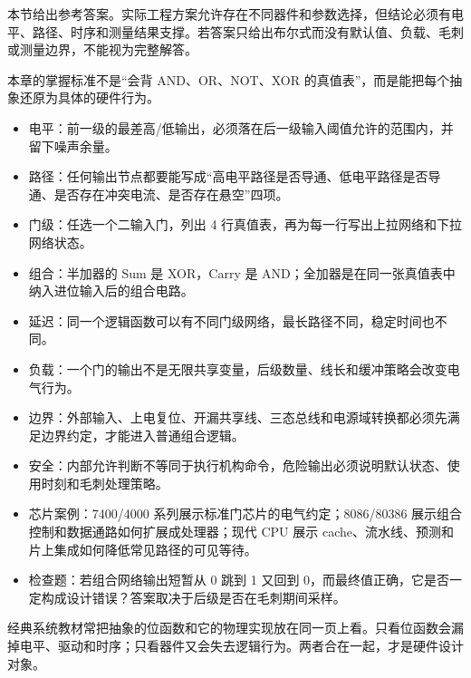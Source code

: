 本节给出参考答案。实际工程方案允许存在不同器件和参数选择，但结论必须有电平、路径、时序和测量结果支撑。若答案只给出布尔式而没有默认值、负载、毛刺或测量边界，不能视为完整解答。



















































\begin{classicnote}
本章的掌握标准不是“会背 AND、OR、NOT、XOR 的真值表”，而是能把每个抽象还原为具体的硬件行为。

\begin{itemize}
\item 电平：前一级的最差高/低输出，必须落在后一级输入阈值允许的范围内，并留下噪声余量。
\item 路径：任何输出节点都要能写成“高电平路径是否导通、低电平路径是否导通、是否存在冲突电流、是否存在悬空”四项。
\item 门级：任选一个二输入门，列出 4 行真值表，再为每一行写出上拉网络和下拉网络状态。
\item 组合：半加器的 Sum 是 XOR，Carry 是 AND；全加器是在同一张真值表中纳入进位输入后的组合电路。
\item 延迟：同一个逻辑函数可以有不同门级网络，最长路径不同，稳定时间也不同。
\item 负载：一个门的输出不是无限共享变量，后级数量、线长和缓冲策略会改变电气行为。
\item 边界：外部输入、上电复位、开漏共享线、三态总线和电源域转换都必须先满足边界约定，才能进入普通组合逻辑。
\item 安全：内部允许判断不等同于执行机构命令，危险输出必须说明默认状态、使用时刻和毛刺处理策略。
\item 芯片案例：7400/4000 系列展示标准门芯片的电气约定；8086/80386 展示组合控制和数据通路如何扩展成处理器；现代 CPU 展示 cache、流水线、预测和片上集成如何降低常见路径的可见等待。
\item 检查题：若组合网络输出短暂从 0 跳到 1 又回到 0，而最终值正确，它是否一定构成设计错误？答案取决于后级是否在毛刺期间采样。
\end{itemize}

经典系统教材常把抽象的位函数和它的物理实现放在同一页上看。只看位函数会漏掉电平、驱动和时序；只看器件又会失去逻辑行为。两者合在一起，才是硬件设计对象。
\end{classicnote}

